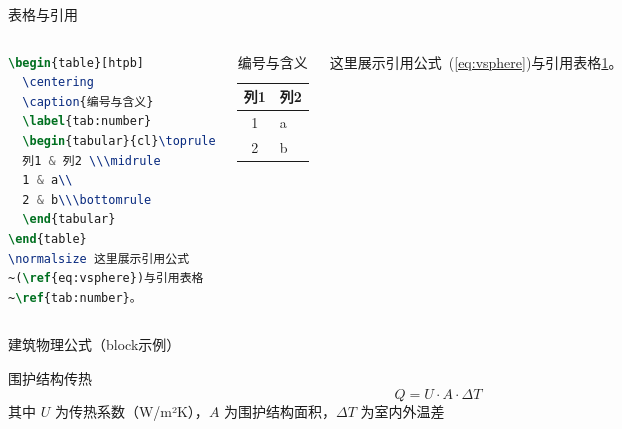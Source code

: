 \documentclass{beamer}
\begin{document}
\begin{frame}[fragile]{表格与引用}
    \begin{columns}
\begin{lstlisting}[language=TeX]
\begin{table}[htpb]
  \centering
  \caption{编号与含义}
  \label{tab:number}
  \begin{tabular}{cl}\toprule
  列1 & 列2 \\\midrule
  1 & a\\
  2 & b\\\bottomrule
  \end{tabular}
\end{table}
\normalsize 这里展示引用公式
~(\ref{eq:vsphere})与引用表格
~\ref{tab:number}。
\end{lstlisting}
        \begin{table}[htpb]
            \centering
            \caption{编号与含义}
            \label{tab:number}
            \begin{tabular}{cl}\toprule
                列1 & 列2 \\\midrule
                1 & a\\
                2 & b\\\bottomrule
            \end{tabular}
        \end{table}
        \normalsize 这里展示引用公式~(\ref{eq:vsphere})与引用表格\ref{tab:number}。
    \end{columns}
\end{frame}
\begin{frame}{建筑物理公式（block示例）}
    \vspace{-0.4em}
    \begin{exampleblock}{围护结构传热}
        \begin{equation*}
            Q = U \cdot A \cdot \Delta T
        \end{equation*}
        其中 $U$ 为传热系数（W/m²K），$A$ 为围护结构面积，$\Delta T$ 为室内外温差
    \end{exampleblock}
\end{frame}
\end{document}
